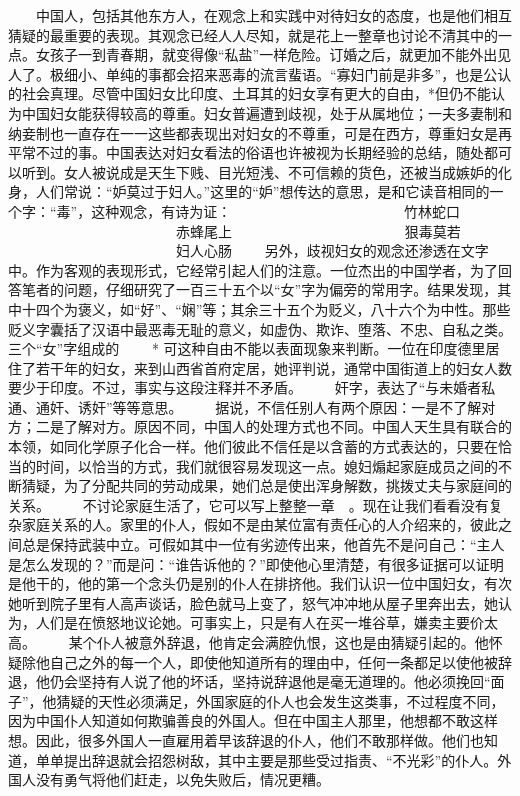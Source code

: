 \documentclass[12pt,oneside]{book}
\begin{document}
\begin{common-format}
　　中国人，包括其他东方人，在观念上和实践中对待妇女的态度，也是他们相互猜疑的最重要的表现。其观念已经人人尽知，就是花上一整章也讨论不清其中的一点。女孩子一到青春期，就变得像“私盐”一样危险。订婚之后，就更加不能外出见人了。极细小、单纯的事都会招来恶毒的流言蜚语。“寡妇门前是非多”，也是公认的社会真理。尽管中国妇女比印度、土耳其的妇女享有更大的自由，*但仍不能认为中国妇女能获得较高的尊重。妇女普遍遭到歧视，处于从属地位；一夫多妻制和纳妾制也一直存在一一这些都表现出对妇女的不尊重，可是在西方，尊重妇女是再平常不过的事。中国表达对妇女看法的俗语也许被视为长期经验的总结，随处都可以听到。女人被说成是天生下贱、目光短浅、不可信赖的货色，还被当成嫉妒的化身，人们常说：“妒莫过于妇人。”这里的“妒”想传达的意思，是和它读音相同的一个字：“毒”，这种观念，有诗为证： 
　　　　　　　　　　　　竹林蛇口 
　　　　　　　　　　　　赤蜂尾上 
　　　　　　　　　　　　狠毒莫若 
　　　　　　　　　　　　妇人心肠 
　　另外，歧视妇女的观念还渗透在文字中。作为客观的表现形式，它经常引起人们的注意。一位杰出的中国学者，为了回答笔者的问题，仔细研究了一百三十五个以“女”字为偏旁的常用字。结果发现，其中十四个为褒义，如“好”、“娴”等；其余三十五个为贬义，八十六个为中性。那些贬义字囊括了汉语中最恶毒无耻的意义，如虚伪、欺诈、堕落、不忠、自私之类。三个“女”字组成的 
　　* 可这种自由不能以表面现象来判断。一位在印度德里居住了若干年的妇女，来到山西省首府定居，她评判说，通常中国街道上的妇女人数要少于印度。不过，事实与这段注释并不矛盾。 
　　奸字，表达了“与未婚者私通、通奸、诱奸”等等意思。 
　　据说，不信任别人有两个原因：一是不了解对方；二是了解对方。原因不同，中国人的处理方式也不同。中国人天生具有联合的本领，如同化学原子化合一样。他们彼此不信任是以含蓄的方式表达的，只要在恰当的时间，以恰当的方式，我们就很容易发现这一点。媳妇煽起家庭成员之间的不断猜疑，为了分配共同的劳动成果，她们总是使出浑身解数，挑拨丈夫与家庭间的关系。 
　　不讨论家庭生活了，它可以写上整整一章　。现在让我们看看没有复杂家庭关系的人。家里的仆人，假如不是由某位富有责任心的人介绍来的，彼此之间总是保持武装中立。可假如其中一位有劣迹传出来，他首先不是问自己：“主人是怎么发现的？”而是问：“谁告诉他的？”即使他心里清楚，有很多证据可以证明是他干的，他的第一个念头仍是别的仆人在排挤他。我们认识一位中国妇女，有次她听到院子里有人高声谈话，脸色就马上变了，怒气冲冲地从屋子里奔出去，她认为，人们是在愤怒地议论她。可事实上，只是有人在买一堆谷草，嫌卖主要价太高。 
　　某个仆人被意外辞退，他肯定会满腔仇恨，这也是由猜疑引起的。他怀疑除他自己之外的每一个人，即使他知道所有的理由中，任何一条都足以使他被辞退，他仍会坚持有人说了他的坏话，坚持说辞退他是毫无道理的。他必须挽回“面子”，他猜疑的天性必须满足，外国家庭的仆人也会发生这类事，不过程度不同，因为中国仆人知道如何欺骗善良的外国人。但在中国主人那里，他想都不敢这样想。因此，很多外国人一直雇用着早该辞退的仆人，他们不敢那样做。他们也知道，单单提出辞退就会招怨树敌，其中主要是那些受过指责、“不光彩”的仆人。外国人没有勇气将他们赶走，以免失败后，情况更糟。 

\end{common-format}
\end{document}
